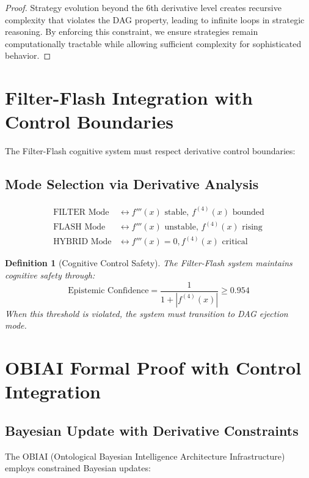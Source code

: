 \documentclass[11pt]{article}
\newtheorem{definition}{Definition}
\begin{document}
\begin{proof}
Strategy evolution beyond the 6th derivative level creates recursive complexity that violates the DAG property, leading to infinite loops in strategic reasoning. By enforcing this constraint, we ensure strategies remain computationally tractable while allowing sufficient complexity for sophisticated behavior.
\end{proof}

\section{Filter-Flash Integration with Control Boundaries}

The Filter-Flash cognitive system must respect derivative control boundaries:

\subsection{Mode Selection via Derivative Analysis}

\begin{align}
\text{FILTER Mode} &\leftrightarrow f'''(x) \text{ stable, } f^{(4)}(x) \text{ bounded} \\
\text{FLASH Mode} &\leftrightarrow f'''(x) \text{ unstable, } f^{(4)}(x) \text{ rising} \\
\text{HYBRID Mode} &\leftrightarrow f'''(x) = 0, f^{(4)}(x) \text{ critical}
\end{align}

\begin{definition}[Cognitive Control Safety]
The Filter-Flash system maintains cognitive safety through:
$$\text{Epistemic Confidence} = \frac{1}{1 + |f^{(4)}(x)|} \geq 0.954$$
When this threshold is violated, the system must transition to DAG ejection mode.
\end{definition}

\section{OBIAI Formal Proof with Control Integration}

\subsection{Bayesian Update with Derivative Constraints}

The OBIAI (Ontological Bayesian Intelligence Architecture Infrastructure) employs constrained Bayesian updates:
\end{document}
